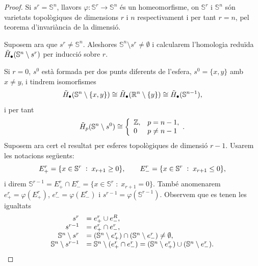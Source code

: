 \documentclass[../main.tex]{subfiles}
\begin{document}
\begin{proof}
Si $s^r = \mathbb{S}^n$, llavors $\varphi:\mathbb{S}^r\rightarrow\mathbb{S}^n$ és un homeomorfisme, on $\mathbb{S}^r$ i $\mathbb{S}^n$ són varietats topològiques de dimensions $r$ i $n$ respectivament i per tant $r = n$, pel teorema d'invariància de la dimensió.

Suposem ara que $s^r\not=\mathbb{S}^n$. Aleshores $\mathbb{S}^n\setminus s^r\not=\emptyset$ i calcularem l'homologia reduïda $\Tilde{H}_\bullet(\mathbb{S}^n\setminus s^r)$ per inducció sobre $r$.

Si $r = 0$, $s^0$ està formada per dos punts diferents de l'esfera, $s^0 = \{x,y\}$ amb $x\not=y$, i tindrem isomorfismes
\begin{equation}
    \notag
    \Tilde{H}_\bullet(\mathbb{S}^n\setminus\{x,y\})\cong\Tilde{H}_\bullet(\mathbb{R}^n\setminus\{y\})\cong\Tilde{H}_\bullet(\mathbb{S}^{n-1}),
\end{equation}
i per tant
\begin{equation}
    \notag
    \Tilde{H}_p(\mathbb{S}^n\setminus s^0)\cong\left\{
    \begin{array}{ll}
        \mathbb{Z}, & p=n-1, \\
        0 & p\not=n-1
    \end{array}.
    \right.
\end{equation}
Suposem ara cert el resultat per esferes topològiques de dimensió $r-1$. Usarem les notacions següents:
\begin{equation}
    \notag
    E_+^r = \{x\in\mathbb{S}^r\;:\;x_{r+1}\geq 0\},\qquad E_-^r=\{x\in\mathbb{S}^r\;:\;x_{r+1}\leq 0\},
\end{equation}
i direm $\mathbb{S}^{r-1} = E_+^r\cap E_-^r = \{x\in\mathbb{S}^r\;:\;x_{r+1}=0\}$. També anomenarem $e_+^r=\varphi(E_+^r)$, $e_-^r=\varphi(E_-^r)$ i $s^{r-1} = \varphi(\mathbb{S}^{r-1})$. Observem que es tenen les igualtats
\begin{equation}
    \notag
    \begin{array}{rl}
        s^r & = e_+^r\cup e_-^R, \\
        s^{r-1} & = e_+^r\cap e_-^r, \\
        \mathbb{S}^n\setminus s^r & = (\mathbb{S}^n\setminus e_+^r)\cap(\mathbb{S}^n\setminus e_-^r)\not=\emptyset,\\
        \mathbb{S}^n\setminus s^{r-1} & = \mathbb{S}^n\setminus (e_+^r\cap e_-^r) = (\mathbb{S}^n\setminus e_+^r)\cup(\mathbb{S}^n\setminus e_-^r).
    \end{array}

\end{equation}
\end{proof}
\end{document}
